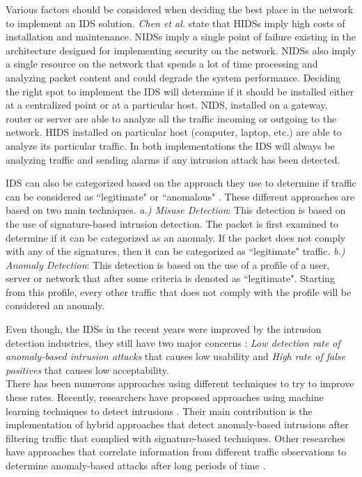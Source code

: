 \documentclass[conference]{IEEEtran}
\begin{document}
Various factors should be considered when deciding the best place in the network to implement an IDS solution.  \emph{Chen et al.} \cite{chen2010efficientnetworkintrusion} state that HIDSs imply high costs of installation and maintenance.  NIDSs imply a single point of failure existing in the architecture designed for implementing security on the network.  NIDSs also imply a single resource on the network that spends a lot of time processing and analyzing packet content and could degrade the system performance. Deciding the right spot to implement the IDS will determine if it should be installed either at a centralized point or at a particular host.  NIDS,  installed on a gateway, router or server are able to analyze all the traffic incoming or outgoing to the network.  HIDS installed on particular host (computer, laptop, etc.) are able to analyze its particular traffic.  In both implementations the IDS will always be analyzing traffic and sending alarms if any intrusion attack has been detected.

IDS can also be categorized based on the approach they use to determine if traffic can be considered as ``legitimate" or ``anomalous" \cite{deshmukhDetectionOfAttacks} \cite{garcia2009anomaly}. These different approaches are based on two main techniques. \emph{a.) Misuse Detection}:  This detection is based on the use of signature-based intrusion detection.  The packet is first examined to determine if it can be categorized as an anomaly. If the packet does not comply with any of the signatures, then it can be categorized as ``legitimate" traffic.  \emph{b.) Anomaly Detection}: This detection is based on the use of a profile of a user, server or network that after some criteria is denoted as ``legitimate". Starting from this profile, every other traffic that does not comply with the profile will be considered an anomaly.

Even though, the IDSs in the recent years were improved by the intrusion detection industries, they still have two major concerns \cite{thomas2013application}: \textit{Low detection rate of anomaly-based intrusion attacks} that causes low usability and \textit{High rate of false positives} that causes low acceptability.\\

There has been numerous approaches using different techniques to try to improve these rates.  Recently, researchers have proposed approaches using machine learning techniques to detect intrusions \cite{tsai2009intrusion} \cite{aydin2009hybrid} \cite{panda2012hybrid} \cite{thomas2013application} \cite{bajaj2013improving}. Their main contribution is the implementation of hybrid approaches that detect anomaly-based intrusions after filtering traffic that complied with signature-based techniques. Other researches have approaches that correlate information from different traffic observations to determine anomaly-based attacks after long periods of time \cite{tsai2010triangle}.              
\end{document}
